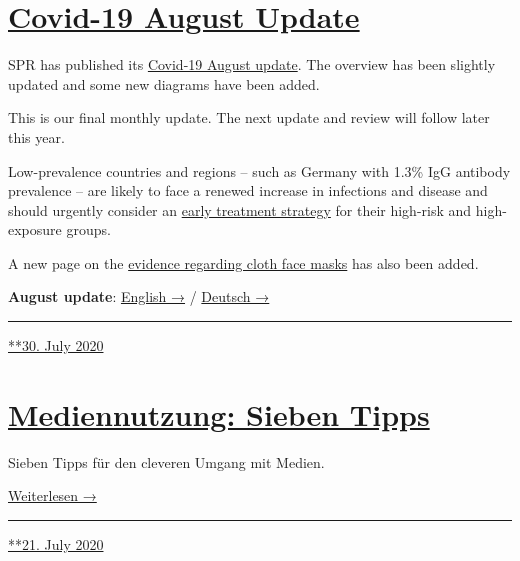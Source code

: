 \hypertarget{covid-19-august-update}{%
\section{\texorpdfstring{\href{https://swprs.org/2020/07/30/covid-19-august-update/}{Covid-19
August Update}}{Covid-19 August Update}}\label{covid-19-august-update}}

SPR has published its
\href{https://swprs.org/a-swiss-doctor-on-covid-19/}{Covid-19 August
update}. The overview has been slightly updated and some new diagrams
have been added.

This is our final monthly update. The next update and review will follow
later this year.

Low-prevalence countries and regions -- such as Germany with 1.3\% IgG
antibody prevalence -- are likely to face a renewed increase in
infections and disease and should urgently consider an
\href{https://swprs.org/on-the-treatment-of-covid-19/}{early treatment
strategy} for their high-risk and high-exposure groups.

A new page on the \href{https://swprs.org/face-masks-evidence/}{evidence
regarding cloth face masks} has also been added.

\textbf{August update}:
\href{https://swprs.org/a-swiss-doctor-on-covid-19/}{English →} /
\href{https://swprs.org/covid-19-hinweis-ii/}{Deutsch →}

\begin{center}\rule{0.5\linewidth}{\linethickness}\end{center}

\href{https://swprs.org/2020/07/30/covid-19-august-update/}{**30. July
2020}

\hypertarget{mediennutzung-sieben-tipps}{%
\section{\texorpdfstring{\href{https://swprs.org/2020/07/21/mediennutzung-sieben-tipps/}{Mediennutzung:
Sieben
Tipps}}{Mediennutzung: Sieben Tipps}}\label{mediennutzung-sieben-tipps}}

Sieben Tipps für den cleveren Umgang mit Medien.

\href{https://swprs.org/mediennutzung-sieben-tipps/}{Weiterlesen →}

\begin{center}\rule{0.5\linewidth}{\linethickness}\end{center}

\href{https://swprs.org/2020/07/21/mediennutzung-sieben-tipps/}{**21.
July 2020}

